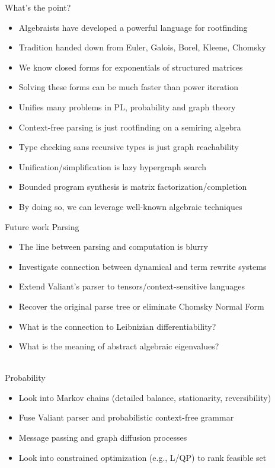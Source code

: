 \documentclass{beamer}
\begin{document}
    \begin{frame}{What's the point?}
        \begin{itemize}
            \item Algebraists have developed a powerful language for rootfinding
            \item Tradition handed down from Euler, Galois, Borel, Kleene, Chomsky
            \item We know closed forms for exponentials of structured matrices
            \item Solving these forms can be much faster than power iteration
            \item Unifies many problems in PL, probability and graph theory
            \item Context-free parsing is just rootfinding on a semiring algebra
            \item Type checking sans recursive types is just graph reachability
            \item Unification/simplification is lazy hypergraph search
            \item Bounded program synthesis is matrix factorization/completion
            \item By doing so, we can leverage well-known algebraic techniques
        \end{itemize}
    \end{frame}

    \begin{frame}{Future work}
        Parsing
        \begin{itemize}
            \item The line between parsing and computation is blurry
            \item Investigate connection between dynamical and term rewrite systems
            \item Extend Valiant's parser to tensors/context-sensitive languages
            \item Recover the original parse tree or eliminate Chomsky Normal Form
            \item What is the connection to Leibnizian differentiability?
            \item What is the meaning of abstract algebraic eigenvalues?
        \end{itemize}
        \phantom{space}\\
        Probability
        \begin{itemize}
            \item Look into Markov chains (detailed balance, stationarity, reversibility)
        \item Fuse Valiant parser and probabilistic context-free grammar
        \item Message passing and graph diffusion processes
        \item Look into constrained optimization (e.g., L/QP) to rank feasible set
        \end{itemize}
    \end{frame}
\end{document}
